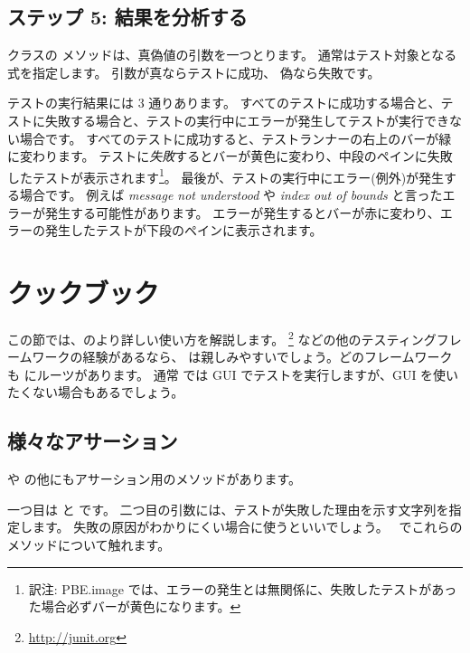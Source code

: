 \documentclass[a4paper,10pt,twoside]{book}
\begin{document}
\subsection{ステップ 5: 結果を分析する}

 クラスの  メソッドは、真偽値の引数を一つとります。
通常はテスト対象となる式を指定します。
引数が真ならテストに成功、
偽なら失敗です。


テストの実行結果には 3 通りあります。
すべてのテストに成功する場合と、テストに失敗する場合と、テストの実行中にエラーが発生してテストが実行できない場合です。
すべてのテストに成功すると、テストランナーの右上のバーが緑に変わります。
テストに\emph{失敗}するとバーが黄色に変わり、中段のペインに失敗したテストが表示されます\footnote{訳注: PBE.image では、エラーの発生とは無関係に、失敗したテストがあった場合必ずバーが黄色になります。}。
最後が、テストの実行中にエラー(例外)が発生する場合です。
例えば \emph{message not understood} や \emph{index out of bounds} と言ったエラーが発生する可能性があります。
エラーが発生するとバーが赤に変わり、エラーの発生したテストが下段のペインに表示されます。


\section{\SUnit クックブック}
この節では、\SUnit のより詳しい使い方を解説します。
\JUnit\footnote{\url{http://junit.org}} などの他のテスティングフレームワークの経験があるなら、
\SUnit は親しみやすいでしょう。どのフレームワークも \SUnit にルーツがあります。
通常 \SUnit では GUI でテストを実行しますが、GUI を使いたくない場合もあるでしょう。
\subsection{様々なアサーション}
 や  の他にもアサーション用のメソッドがあります。

一つ目は  と  です。
二つ目の引数には、テストが失敗した理由を示す文字列を指定します。
失敗の原因がわかりにくい場合に使うといいでしょう。
~でこれらのメソッドについて触れます。
\end{document}
